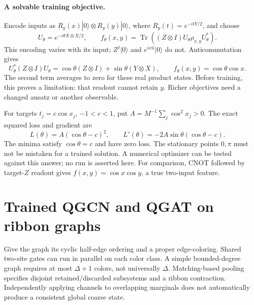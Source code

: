 \documentclass[11pt,oneside,openany]{book}
\theoremstyle{definition}\newtheorem{definition}[theorem]{Definition}
\theoremstyle{remark}\newtheorem{remark}[theorem]{Remark}
\begin{document}
\paragraph{A solvable training objective.}
Encode inputs as $R_y(x)|0\rangle\otimes R_y(y)|0\rangle$, where
$R_y(t)=e^{-itY/2}$, and choose
\[
 U_\theta=e^{-i\theta X\otimes X/2},\qquad
 f_\theta(x,y)=\operatorname{Tr}((Z\otimes I)U_\theta\rho_{x,y}U_\theta^*).
\]
This encoding varies with its input; $Z^j|0\rangle$ and
$e^{ix\hat n}|0\rangle$ do not. Anticommutation gives
\[
 U_\theta^*(Z\otimes I)U_\theta
 =\cos\theta(Z\otimes I)+\sin\theta(Y\otimes X),
 \qquad f_\theta(x,y)=\cos\theta\cos x.
\]
The second term averages to zero for these real product states. Before
training, this proves a limitation: that readout cannot retain $y$. Richer
objectives need a changed ansatz or another observable.

For targets $t_j=c\cos x_j$, $-1<c<1$, put
$A=M^{-1}\sum_j\cos^2x_j>0$. The exact squared loss and gradient are
\[
 L(\theta)=A(\cos\theta-c)^2,\qquad
 L'(\theta)=-2A\sin\theta(\cos\theta-c).
\]
The minima satisfy $\cos\theta=c$ and have zero loss. The stationary
points $0,\pi$ must not be mistaken for a trained solution. A numerical
optimizer can be tested against this answer; no run is asserted here.
For comparison, CNOT followed by target-$Z$ readout gives
$f(x,y)=\cos x\cos y$, a true two-input feature.

\begin{center}
\end{center}

\section{Trained QGCN and QGAT on ribbon graphs}
Give the graph its cyclic half-edge ordering and a proper edge-coloring.
Shared two-site gates can run in parallel on each color class. A simple
bounded-degree graph requires at most $\Delta+1$ colors, not universally
$\Delta$. Matching-based pooling specifies disjoint retained/discarded
subsystems and a ribbon contraction. Independently applying channels to
overlapping marginals does not automatically produce a consistent global
coarse state.
\end{document}
